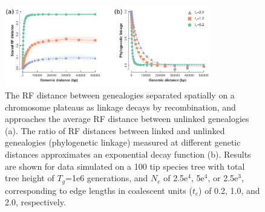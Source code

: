 \documentclass[11pt]{article}
\begin{document}
\begin{figure}
	\centering
		\includegraphics[width=0.8\textwidth]{./figures/Fig-2}
		\caption{
		The RF distance between genealogies separated spatially on a chromosome plateaus as linkage decays by recombination, and  approaches the average RF distance between unlinked genealogies (a). The ratio of RF distances between linked and unlinked genealogies (phylogenetic linkage) measured at different genetic distances approximates an exponential decay function (b). Results are shown for data simulated on a 100 tip species tree with total tree height of $T_g$=1e6 generations, and $N_e$ of 2.5e$^4$, 5e$^4$, or 2.5e$^3$, corresponding to edge lengths in coalescent units ($t_c$) of 0.2, 1.0, and 2.0, respectively. 
		}
		\label{fig:2}
\end{figure}


\end{document}

